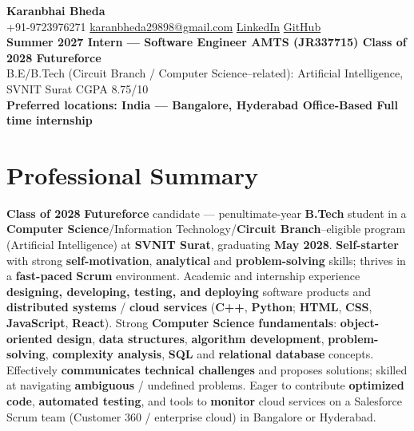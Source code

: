 \documentclass[a4paper,10pt]{article}
\begin{document}
\selectfont

\begin{center}
  {\LARGE \textbf{Karanbhai Bheda}} \\[0.9mm]
  \small
  +91-9723976271 \textbar{}
  \href{mailto:karanbheda29898@gmail.com}{karanbheda29898@gmail.com} \textbar{}
  \href{https://www.linkedin.com/in/karan-bheda-2a7483335/}{LinkedIn} \textbar{}
  \href{https://github.com/KARANBHAI029}{GitHub} \\[0.45mm]
  \textbf{Summer 2027 Intern --- Software Engineer AMTS (JR337715) \textbar{} Class of 2028 \textbar{} Futureforce} \\[0.25mm]
  B.E/B.Tech (Circuit Branch / Computer Science--related): Artificial Intelligence, SVNIT Surat \textbar{} CGPA 8.75/10 \\[0.25mm]
  \textbf{Preferred locations: India --- Bangalore, Hyderabad \textbar{} Office-Based \textbar{} Full time internship}
\end{center}

\vspace{-0.8mm}

\section{Professional Summary}
\small
\textbf{Class of 2028} \textbf{Futureforce} candidate --- penultimate-year \textbf{B.Tech} student in a \textbf{Computer Science}/Information Technology/\textbf{Circuit Branch}--eligible program (Artificial Intelligence) at \textbf{SVNIT Surat}, graduating \textbf{May 2028}. \textbf{Self-starter} with strong \textbf{self-motivation}, \textbf{analytical} and \textbf{problem-solving} skills; thrives in a \textbf{fast-paced} \textbf{Scrum} environment. Academic and internship experience \textbf{designing, developing, testing, and deploying} software products and \textbf{distributed systems} / \textbf{cloud services} (\textbf{C++}, \textbf{Python}; \textbf{HTML}, \textbf{CSS}, \textbf{JavaScript}, \textbf{React}). Strong \textbf{Computer Science fundamentals}: \textbf{object-oriented design}, \textbf{data structures}, \textbf{algorithm development}, \textbf{problem-solving}, \textbf{complexity analysis}, \textbf{SQL} and \textbf{relational database} concepts. Effectively \textbf{communicates technical challenges} and proposes solutions; skilled at navigating \textbf{ambiguous} / undefined problems. Eager to contribute \textbf{optimized code}, \textbf{automated testing}, and tools to \textbf{monitor} cloud services on a Salesforce Scrum team (Customer 360 / enterprise cloud) in Bangalore or Hyderabad.
\end{document}
